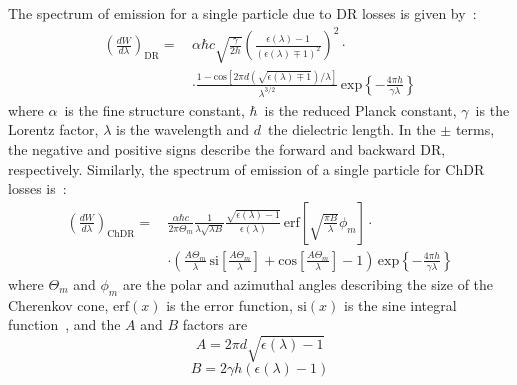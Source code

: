 The spectrum of emission for a single particle due to DR losses is given by~\cite{CERN-Report-II}:
\begin{equation}
\begin{aligned}
\left(\frac{dW}{d\lambda} \right)_\text{DR} = \, & \alpha \hbar c \sqrt{\frac{\gamma}{2 h}} \left( \frac{\epsilon(\lambda) -1 }{\left( \epsilon(\lambda) \mp 1  \right)^2}  \right)^2 \cdot \\ & \cdot \frac{1 - \text{cos}\left[ 2\pi d \left( \sqrt{\epsilon(\lambda) \mp 1} \right) /\lambda\right]}{\lambda^{3/2}} \, \text{exp}\left\{ -\frac{4\pi h}{\gamma \lambda} \right\}
\end{aligned}
\end{equation}
where $\alpha$~is the fine structure constant, $\hbar$~is the reduced Planck constant, $\gamma$~is the Lorentz factor, $\lambda$ is the wavelength and $d$~the dielectric length. In the $\pm$ terms, the  negative and positive signs describe the forward and backward DR, respectively. Similarly, the spectrum of emission of a single particle for ChDR losses is~\cite{CERN-Report-II}:
\begin{equation}\label{eq:chdr_loss}
\begin{aligned}
\left(\frac{dW}{d\lambda} \right)_\text{ChDR} = \,&   \frac{\alpha \hbar c}{2\pi \Theta_m} \frac{1}{\lambda\sqrt{\lambda B}} \frac{\sqrt{\epsilon\left(\lambda \right)-1}}{\epsilon\left(\lambda \right)} \, \text{erf} \left[ \sqrt{\frac{\pi B}{\lambda}} \phi_m \right] \cdot \\ & \cdot \left( \frac{A\Theta_m}{\lambda} \, \text{si}\left[\frac{A\Theta_m}{\lambda} \right]  + \text{cos}\left[\frac{A\Theta_m}{\lambda} \right] -1 \right) \, \text{exp}\left\{ -\frac{4\pi h}{\gamma \lambda} \right\}
\end{aligned}
\end{equation}
where $\Theta_m$ and $\phi_m$ are the polar and azimuthal angles describing the size of the Cherenkov cone, $\text{erf}(x)$ is the error function, $\text{si}(x)$ is the sine integral function~\cite{Brychkov:1251968}, and the $A$ and $B$ factors are 
$$A = 2\pi d \sqrt{\epsilon \left( \lambda \right) -1 }$$ 
$$B = 2\gamma h \left(\epsilon \left( \lambda \right) -1 \right)$$


